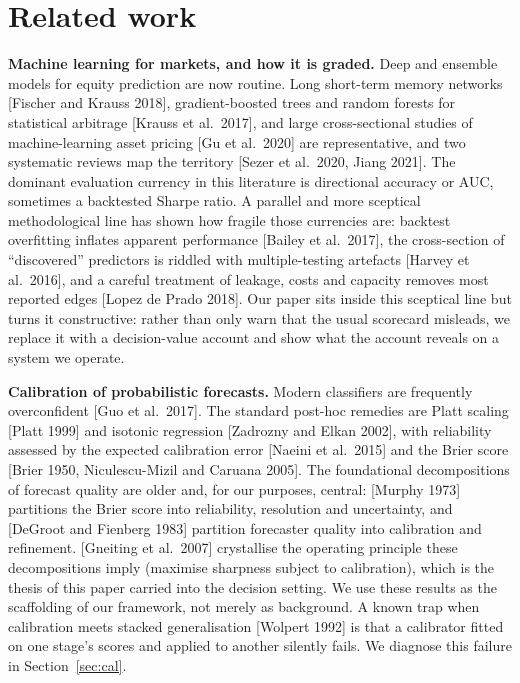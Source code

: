 \documentclass[10pt,a4paper,oneside]{article}
\theoremstyle{definition}
\theoremstyle{plain}
\begin{document}
\section{Related work}
\label{sec:related}
\noindent\textbf{Machine learning for markets, and how it is graded.}
Deep and ensemble models for equity prediction are now routine. Long short-term
memory networks [Fischer and Krauss 2018], gradient-boosted trees and random forests
for statistical arbitrage [Krauss et al.\ 2017], and large cross-sectional studies of
machine-learning asset pricing [Gu et al.\ 2020] are representative, and two
systematic reviews map the territory [Sezer et al.\ 2020, Jiang 2021]. The dominant
evaluation currency in this literature is directional accuracy or AUC, sometimes a
backtested Sharpe ratio. A parallel and more sceptical methodological line has shown
how fragile those currencies are: backtest overfitting inflates apparent performance
[Bailey et al.\ 2017], the cross-section of ``discovered'' predictors is riddled with
multiple-testing artefacts [Harvey et al.\ 2016], and a careful treatment of leakage,
costs and capacity removes most reported edges [Lopez de Prado 2018]. Our paper sits
inside this sceptical line but turns it constructive: rather than only warn that the
usual scorecard misleads, we replace it with a decision-value account and show what
the account reveals on a system we operate.

\noindent\textbf{Calibration of probabilistic forecasts.}
Modern classifiers are frequently overconfident [Guo et al.\ 2017]. The standard
post-hoc remedies are Platt scaling [Platt 1999] and isotonic regression
[Zadrozny and Elkan 2002], with reliability assessed by the expected calibration
error [Naeini et al.\ 2015] and the Brier score [Brier 1950, Niculescu-Mizil and
Caruana 2005]. The foundational decompositions of forecast quality are older and,
for our purposes, central: [Murphy 1973] partitions the Brier score into reliability,
resolution and uncertainty, and [DeGroot and Fienberg 1983] partition forecaster
quality into calibration and refinement. [Gneiting et al.\ 2007] crystallise the
operating principle these decompositions imply (maximise sharpness subject to
calibration), which is the thesis of this paper carried into the decision setting.
We use these results as the scaffolding of our framework, not merely as background.
A known trap when calibration meets stacked generalisation
[Wolpert 1992] is that a calibrator fitted on one stage's scores and applied to
another silently fails. We diagnose this failure in Section~\ref{sec:cal}.
\end{document}
